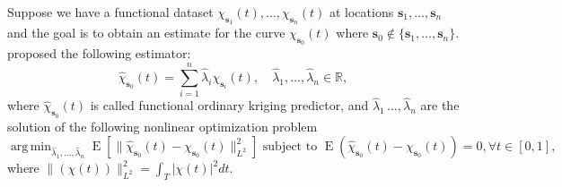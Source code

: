 \documentclass[12pt]{interact}
\theoremstyle{plain}%
\theoremstyle{definition}
\theoremstyle{remark}
\DeclareMathOperator{\espe}{E}
\DeclareMathOperator*{\argmin}{arg\,min}
\begin{document}
Suppose we have a functional dataset \(\chi_{\bm{s}_1}(t), \dots, \chi_{\bm{s}_n}(t)\) at locations \(\bm{s}_1, \dots, \bm{s}_n\) and the goal is to obtain an estimate for the curve \(\chi_{\bm{s}_0}(t)\) where \(\bm{s}_0 \not\in \{\bm{s}_1, \dots, \bm{s}_n\}\). \citet{giraldo2011ordinary} proposed the following estimator:
\begin{equation}
\hat\chi_{\bm{s}_0} (t) = \sum_{i=1}^{n} \hat\lambda_i \chi_{\bm{s}_i}(t),\quad \hat\lambda_1, \dots, \hat\lambda_{n} \in \mathbb{R},
\label{eq:ModelOrdinary}
\end{equation}
where \(\hat\chi_{\bm{s}_0}(t)\) is called functional ordinary kriging predictor, and \(\hat\lambda_1\, \dots, \hat\lambda_{n}\) are the solution of the following nonlinear optimization problem
\begin{equation}
\argmin_{\hat{\lambda}_1, \dots, \hat{\lambda}_{n}} \espe \left[ \lVert\hat{\chi}_{\bm{s}_0}(t) - \chi_{\bm{s}_0}(t) \rVert^2_{L^2}\right] \mbox{ subject to }\espe(\hat{\chi}_{\bm{s}_0}(t) - \chi_{\bm{s}_0}(t)) =0, \forall t \in [0,1],
\label{eq:naoLinear}
\end{equation}
where \(\lVert(\chi(t))\rVert^2_{L^2}= \int_{T} \lvert \chi(t)\rvert^2 dt.\)
\end{document}
